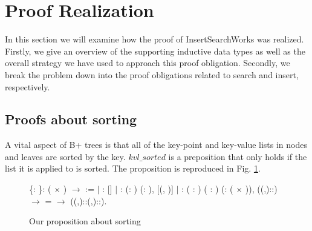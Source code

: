 \section{Proof Realization}
\label{sec:ProofRealization}
In this section we will examine how the proof of InsertSearchWorks was realized. Firstly, we give an overview of the supporting inductive data types as well as the overall strategy we have used to approach this proof obligation. Secondly, we break the problem down into the proof obligations related to search and insert, respectively. 

\subsection{Proofs about sorting}
A vital aspect of B+ trees is that all of the key-point and key-value lists in nodes and leaves are sorted by the key. $kvl\_sorted$ is a preposition that only holds if the list it is applied to is sorted. The proposition is reproduced in Fig. \ref{fig:kvl_sorted}.

\begin{figure}
  \begin{coqdoccode}
  \coqdocnoindent
    \{: \}:  ( \ensuremath{\times} ) \ensuremath{\rightarrow}  :=\coqdoceol
  \coqdocindent{1.00em}
  \ensuremath{|}
  :  []\coqdoceol
  \coqdocindent{1.00em}
  \ensuremath{|} : \coqdockw{\ensuremath{\forall}} (: ) (: ), \coqdoceol
  \coqdocindent{8.00em}
   [(, )]\coqdoceol
  \coqdocindent{1.00em}
  \ensuremath{|} : \coqdockw{\ensuremath{\forall}} ( : ) ( : ) (:  ( \ensuremath{\times} )), \coqdoceol
  \coqdocindent{8.00em}
   ((,)::) \ensuremath{\rightarrow} \coqdoceol
  \coqdocindent{8.00em}
     =  \ensuremath{\rightarrow}\coqdoceol
  \coqdocindent{8.00em}
   ((,)::(,)::).\coqdoceol
  \end{coqdoccode}
  \caption{Our proposition about sorting}
  \label{fig:kvl_sorted}
\end{figure}

